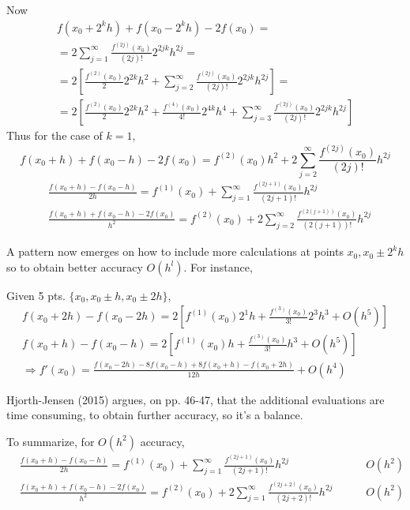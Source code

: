 \documentclass[10pt]{amsart}
\begin{document}
\begin{multicols*}{2}
Now
\[
\begin{gathered}
  f(x_0 + 2^kh) + f(x_0 - 2^kh) - 2f(x_0) = \\
  = 2 \sum_{j=1}^{\infty} \frac{ f^{(2j)}(x_0) }{(2j)!} 2^{2jk} h^{2j} = \\
  = 2 \left[ \frac{ f^{(2)}(x_0)}{2} 2^{2k} h^2 + \sum_{j=2}^{\infty} \frac{ f^{(2j)}(x_0) }{ (2j)!} 2^{2jk} h^{2j} \right] = \\
  = 2 \left[ \frac{ f^{(2)}(x_0) }{2} 2^{2k} h^2 + \frac{ f^{(4)}(x_0)}{4!} 2^{4k} h^4 + \sum_{j=3}^{\infty} \frac{ f^{(2j)}(x_0) }{ (2j)!} 2^{2jk} h^{2j} \right]
  \end{gathered}
\]
Thus for the case of $k=1$,
\[
f(x_0 + h )  + f(x_0 - h) - 2f(x_0) = f^{(2)}(x_0)h^2 + 2 \sum_{j=2}^{\infty} \frac{ f^{(2j)}(x_0)}{(2j)!} h^{2j}
\]
\[
\begin{aligned}
  & \frac{ f(x_0 +h) - f(x_0-h) }{ 2h} = f^{(1)}(x_0) + \sum_{j=1}^{\infty} \frac{ f^{(2j+1)}(x_0) }{(2j+1)!}h^{2j} \\ 
  & \frac{ f(x_0 + h) + f(x_0 - h) - 2f(x_0) }{h^2} = f^{(2)}(x_0) + 2\sum_{j=2}^{\infty} \frac{ f^{(2(j+1) ) }(x_0)}{(2(j+1))!} h^{2j}
  \end{aligned}
\]

A pattern now emerges on how to include more calculations at points $x_0, x_0 \pm 2^kh$ so to obtain better accuracy $O(h^l)$.  For instance,

Given 5 pts. $\lbrace x_0, x_0 \pm h, x_0 \pm 2h \rbrace$,
\[
\begin{gathered}
  f(x_0 + 2h) - f(x_0 -2h) = 2[ f^{(1)}(x_0) 2^1h + \frac{ f^{(3)}(x_0)}{3!} 2^3 h^3 + O(h^5) ] \\ 
  f(x_0+ h) - f(x_0 - h) = 2[ f^{(1)}(x_0) h + \frac{ f^{(3)}(x_0)}{3!} h^3 + O(h^5)] \\
  \Longrightarrow f'(x_0) = \frac{ f(x_0 - 2h) - 8f(x_0-h ) + 8f(x_0 + h) - f(x_0 + 2h) }{ 12h } + O(h^4)
\end{gathered}
\]

Hjorth-Jensen (2015) \cite{Hjor2015} argues, on pp. 46-47, that the additional evaluations are time consuming, to obtain further accuracy, so it's a balance.

To summarize, for $O(h^2)$ accuracy,
\[
\begin{aligned}
  & \frac{ f(x_0 + h) - f(x_0-h) }{2h} = f^{(1)}(x_0) + \sum_{j=1}^{\infty} \frac{ f^{(2j+1)}(x_0 )}{(2j+1)!} h^{2j} & \qquad \, O(h^2) \\ 
  & \frac{ f(x_0 + h) + f(x_0 -h) - 2f(x_0) }{h^2} = f^{(2)}(x_0) + 2\sum_{j=1}^{\infty} \frac{ f^{(2j+2)}(x_0) }{ (2j+2)!} h^{2j} & \qquad \, O(h^2)
  \end{aligned}
\]


\end{multicols*}
\end{document}
